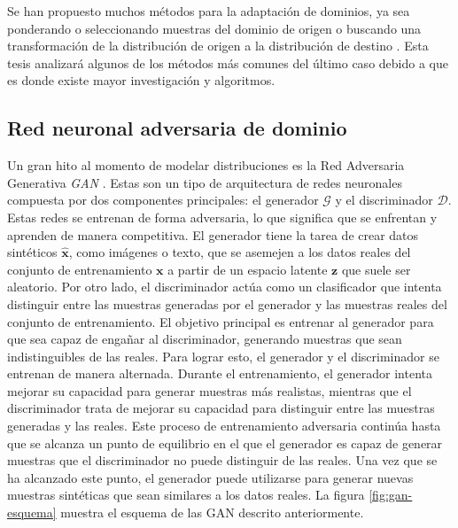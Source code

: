 Se han propuesto muchos métodos para la adaptación de dominios, ya sea ponderando o seleccionando muestras del dominio
de origen \parencite{sugiyama2007direct} o buscando una transformación de la distribución de origen a la distribución de destino \parencite{gong2013connecting}. Esta tesis analizará algunos de los métodos más comunes del último caso debido a que es
donde existe mayor investigación y algoritmos.

\subsection{Red neuronal adversaria de dominio}
Un gran hito al momento de modelar distribuciones es la Red Adversaria Generativa {\it GAN} \parencite{goodfellow2020generative}. Estas son un tipo de arquitectura de redes neuronales compuesta por dos componentes
principales: el generador $\mathcal{G}$ y el discriminador $\mathcal{D}$. Estas redes se entrenan de forma adversaria,
lo que significa que se enfrentan y aprenden de manera competitiva. El generador tiene la tarea de crear datos
sintéticos $\hat{\mathbf{x}}$, como imágenes o texto, que se asemejen a los datos reales del conjunto de entrenamiento
$\mathbf{x}$ a partir de un espacio latente $\mathbf{z}$ que suele ser aleatorio. Por otro lado, el discriminador actúa
como un clasificador que intenta distinguir entre las muestras generadas por el generador y las muestras reales del
conjunto de entrenamiento. El objetivo principal es entrenar al generador para que sea capaz de engañar al
discriminador, generando muestras que sean indistinguibles de las reales. Para lograr esto, el generador y el
discriminador se entrenan de manera alternada. Durante el entrenamiento, el generador intenta mejorar su capacidad para
generar muestras más realistas, mientras que el discriminador trata de mejorar su capacidad para distinguir entre las
muestras generadas y las reales. Este proceso de entrenamiento adversaria continúa hasta que se alcanza un punto de
equilibrio en el que el generador es capaz de generar muestras que el discriminador no puede distinguir de las reales.
Una vez que se ha alcanzado este punto, el generador puede utilizarse para generar nuevas muestras sintéticas que sean
similares a los datos reales. La figura \ref{fig:gan-esquema} muestra el esquema de las GAN descrito anteriormente.

